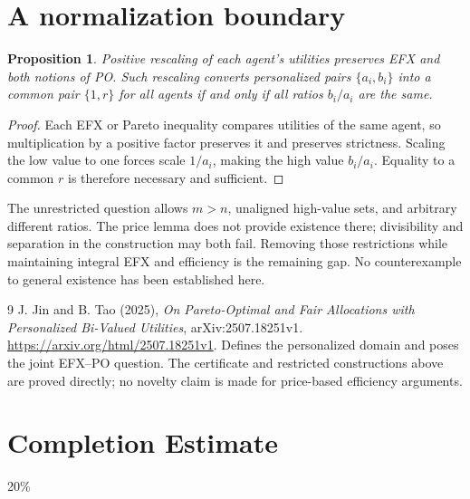 \documentclass[11pt,a4paper]{article}
\newtheorem{proposition}[theorem]{Proposition}
\theoremstyle{definition}
\theoremstyle{remark}
\begin{document}
\section{A normalization boundary}
\begin{proposition}
Positive rescaling of each agent's utilities preserves EFX and both notions of PO. Such rescaling converts personalized pairs $\{a_i,b_i\}$ into a common pair $\{1,r\}$ for all agents if and only if all ratios $b_i/a_i$ are the same.
\end{proposition}
\begin{proof}
Each EFX or Pareto inequality compares utilities of the same agent, so multiplication by a positive factor preserves it and preserves strictness. Scaling the low value to one forces scale $1/a_i$, making the high value $b_i/a_i$. Equality to a common $r$ is therefore necessary and sufficient.
\end{proof}
The unrestricted question allows $m>n$, unaligned high-value sets, and arbitrary different ratios. The price lemma does not provide existence there; divisibility and separation in the construction may both fail. Removing those restrictions while maintaining integral EFX and efficiency is the remaining gap. No counterexample to general existence has been established here.
\begin{thebibliography}{9}
 J. Jin and B. Tao (2025), \emph{On Pareto-Optimal and Fair Allocations with Personalized Bi-Valued Utilities}, arXiv:2507.18251v1. \url{https://arxiv.org/html/2507.18251v1}. Defines the personalized domain and poses the joint EFX--PO question. The certificate and restricted constructions above are proved directly; no novelty claim is made for price-based efficiency arguments.
\end{thebibliography}

\section{Completion Estimate}
20\%
\end{document}
